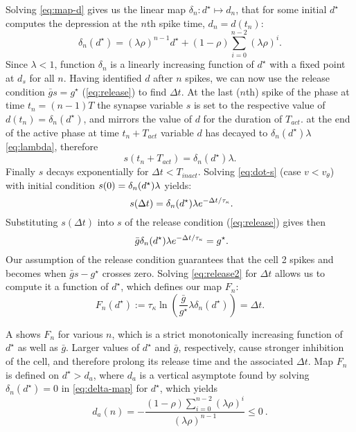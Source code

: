 Solving \cref{eq:map-d} gives us the linear map \(\delta_n:d^{\star}\mapsto d_n\), that for some initial \(d^\star\) computes the depression at the \(n\)th spike time, \(d_n=d(t_n)\):
\begin{equation}
	\label{eq:delta-map}
	\delta_n(d^\star) = (\lambda \rho)^{n-1} d^\star + (1-\rho)\sum_{i=0}^{n-2}(\lambda \rho)^i.
\end{equation}
Since \(\lambda < 1\), function \(\delta_n\) is a linearly increasing function of \(d^\star\) with a fixed point at \(d_s\) for all \(n\).
Having identified \(d\) after \(n\) spikes, we can now use the release condition \(\bar g s = g^{\star}\) (\cref{eq:release}) to find \(\Delta t\).
At the last (\(n\)th) spike of the \free{} phase at time \(t_n = (n-1)T\) the synapse variable \(s\) is set to the respective value of \(d(t_n) = \delta_n(d^\star)\), and mirrors the value of \(d\) for the duration of \(T_{act}\).
at the end of the active phase at time \(t_n + T_{act}\) variable \(d\) has decayed to $\delta_n(d^\star) \lambda$ \cref{eq:lambda}, therefore
\begin{equation}
	s(t_n + T_{act})=\delta_n(d^\star)\lambda.
\end{equation}
Finally \(s\) decays exponentially for \(\Delta t < T_{inact}\).
Solving \cref{eq:dot-s} (case \(v < v_\theta\)) with initial condition \(s(0)=\delta_n(d^\star)\lambda\) yields:
\begin{equation}
	~\label{eq:s-sol}
	s(\Delta t)=\delta_n(d^\star) \lambda e^{-\Delta t/\tau_\kappa}.
\end{equation}
Substituting \(s(\Delta t)\) into \(s\) of the release condition (\cref{eq:release}) gives then
\begin{equation}
	~\label{eq:release2}
	\bar g \delta_n(d^\star) \lambda e^{-\Delta t/\tau_\kappa}=g^{\star}.
\end{equation}
Our assumption of the release condition guarantees that the \quiet{} cell 2 spikes and becomes \free{} when \(\bar g s - g^{\star}\) crosses zero.
Solving \cref{eq:release2} for \(\Delta t\) allows us to compute it a function of \(d^\star\), which defines our map \(F_n\):
\begin{equation}
	\label{eq:Fn-map}
	F_n(d^\star):=\tau_\kappa \ln{\left(\frac{\bar g }{g^\star} \lambda \delta_{n}(d^\star)\right)}= \Delta t.
\end{equation}

A shows \(F_n\) for various \(n\), which is a strict monotonically increasing function of \(d^{\star}\) as well as \(\bar g\).
Larger values of \(d^{\star}\) and \(\bar g\), respectively, cause stronger inhibition of the \quiet{} cell, and therefore prolong its release time and the associated \(\Delta t\).
Map \(F_n\) is defined on \(d^{\star}>d_{a}\), where \(d_{a}\) is a vertical asymptote found by solving \(\delta_{n}(d^\star)=0\) in \cref{eq:delta-map} for \(d^\star\), which yields
\begin{equation}
	d_{a}(n)=-\frac{(1-\rho)\sum_{i=0}^{n-2}(\lambda \rho)^{i}}{ (\lambda \rho)^{n-1} }\leq 0~\label{eq:da}.
\end{equation}

